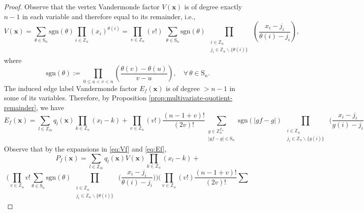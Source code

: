 \begin{proof}
Observe that the vertex Vandermonde factor $V(\mathbf{x})$ is of degree exactly $n-1$ in each variable and therefore equal
to its remainder, i.e.,
\begin{equation}\label{eq:Vf}
V(\mathbf{x})=\sum_{\theta\in\text{S}_{n}}\text{sgn}(\theta)\prod_{i\in\mathbb{Z}_{n}}(x_{i})^{\theta(i)}=\prod_{v\in\mathbb{Z}_{n}}(v!)\;\sum_{\theta\in\text{S}_{n}}\text{sgn}(\theta)\prod_{\begin{array}{c}
\substack{i\in\mathbb{Z}_{n}\\
j_{i}\in\mathbb{Z}_{n}\backslash\{\theta(i)\}
}
\end{array}}\left(\frac{x_{i}-j_{i}}{\theta(i)-j_{i}}\right),
\end{equation}
where 
\begin{equation}
\text{sgn}(\theta):=\prod_{0\le u<v<n}\left(\frac{\theta(v)-\theta(u)}{v-u}\right),\quad\forall\,\theta\in\text{S}_{n}.
\end{equation}
The induced edge label Vandermonde factor $E_f(\mathbf{x})$
is of degree $>n-1$ in some of its variables. Therefore, by Proposition  \ref{prop:multivariate-quotient-remainder}, we have
\begin{equation}\label{eq:Ef}
E_{f}(\mathbf{x})=\sum_{l\in\mathbb{Z}_{m}}q_{l}(\mathbf{x})\prod_{k\in\mathbb{Z}_{n}}(x_{l}-k)+\prod_{v\in\mathbb{Z}_{n}}(v!)\frac{(n-1+v)!}{(2v)!}\sum_{\begin{array}{c}
g\in\mathbb{Z}_{n}^{\mathbb{Z}_{n}}\\
|gf-g|\in\text{S}_{n}
\end{array}}\text{sgn}(|gf-g|)\prod_{\begin{array}{c}
\substack{i\in\mathbb{Z}_{n}\\
j_{i}\in\mathbb{Z}_{n}\backslash\{g(i)\}
}
\end{array}}\big(\frac{x_{i}-j_{i}}{g(i)-j_{i}}\big).
\end{equation}
Observe that by the expansions in \ref{eq:Vf} and \ref{eq:Ef}, 
\[
P_{f}(\mathbf{x})=\sum_{l\in\mathbb{Z}_{m}}q_{l}(\mathbf{x})V(\mathbf{x})\prod_{k\in\mathbb{Z}_{n}}(x_{l}-k)+
\]
\[
\bigg(\prod_{v\in\mathbb{Z}_{n}}v!\sum_{\theta\in\text{S}_{n}}\text{sgn}(\theta)\prod_{\begin{array}{c}
\substack{i\in\mathbb{Z}_{n}\\
j_{i}\in\mathbb{Z}_{n}\backslash\{\theta(i)\}
}
\end{array}}\big(\frac{x_{i}-j_{i}}{\theta(i)-j_{i}}\big)\bigg)\bigg(\prod_{v\in\mathbb{Z}_{n}}(v!)\frac{(n-1+v)!}{(2v)!}\sum_{\begin{array}{c}

\end{array}}\]
\end{proof}
